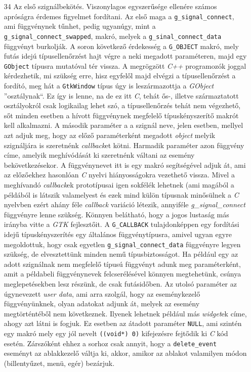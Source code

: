 \documentclass[a4paper,10pt]{article}
\begin{document}
\begin{enumerate}
 \item[34] Az első szignálbekötés. Viszonylagos egyszerűsége ellenére számos apróságra érdemes figyelmet fordítani. Az első maga a \texttt{g\_signal\_connect}, ami függvénynek tűnhet, pedig ugyanúgy, mint a \texttt{g\_signal\_connect\_swapped}, makró, melyek a \texttt{g\_sinal\_connect\_data} függvényt burkolják. A soron következő érdekesség a \texttt{G\_OBJECT} makró, mely futás idejú típusellenőrzést hajt végre a neki megadott paraméteren, majd egy \texttt{GObject} típusra mutatóval tér vissza. A megrögzött \textit{C++} programozók joggal kérdezhetik, mi szükség erre, hisz egyfelől majd elvégzi a típusellenőrzést a fordító, meg hát a \texttt{GtkWindow} típus úgy is leszármazottja a \textit{GObject} ''osztálynak``. Ez így is lenne, na de ez itt \textit{C}, tehát ős-, illetve származtatott osztályokról csak logikailag lehet szó, a típusellenőrzés tehát nem végezhető, sőt minden esetben a hívott függvénynek megfelelő típuskényszerítő makrót kell alkalmazni. A második paraméter a a szignál neve, jelen esetben, mellyel azt adjuk meg, hogy az előző paraméterként megadott \textit{object} melyik szignáljára is szeretnénk \textit{callback}et kötni. Harmadik paraméter azon függvény címe, amelyik meghívódását ki szeretnénk váltani az esemény bekövetkezésekor. A függvénynevet itt is egy makró segítségével adjuk át, ami az előzőekhez hasonlóan \textit{C} nyelvi hiányosságokra vezethető vissza. Mivel a meghívandó \textit{callback}ek prototípusai igen sokfélék lehetnek (ami magából a példából is látszik valamelyest és ezek mind külön típusnak minősülnek a \textit{C} nyelvben ezért ahány féle \textit{callback} variáció létezik, annyiféle \textit{g\_signal\_connect} függvényre lenne szükség. Könnyen belátható, hogy a jogos lustaság más irányba vitte a \textit{GTK} fejlesztőit. A \texttt{G\_CALLBACK} tulajdonképpen egy fordítási idejű típuskényszerítés egy általános függvénytípusra, amivel ugyan egyre megoldottuk, hogy csak egyetlen \texttt{g\_signal\_connect\_data} függvényre legyen szükség, de elvesztettünk minden nemű típusbiztosságot. Ha például egy az adott szignálnak nem megfelelő típusú függvényt adunk meg paraméterként, amit a példabeli függvénynevek felcserélésével könnyen megtehetünk, csúnya meglepetésekben lesz részünk, de csak futásidőben. Az utolsó paraméter az úgynevezett \textit{user data}, ami arra szolgál, hogy az eseménykezelő függvényünknek, olyan adatokat adjunk át, melyek az esemény megtörténtéből nem következnek. Ilyenek lehetnek például más \textit{widget}ek címe, ahogy azt látni is fogjuk. Ez esetben az átadott paraméter \texttt{NULL}, ami szintén egy makró mely egy jól nevelt \texttt{((void*) 0)} kifejezésre fejtődik ki \textit{C} kód esetén. Zárszóként ehhez a sorhoz csak annyit, hogy a \texttt{delete\_event} eseményt az ablakkezelő váltja ki, akkor, amikor az ablakot valamilyen módon (billentyűzet, menü, egér) bezárjuk.


\end{enumerate}
\end{document}
